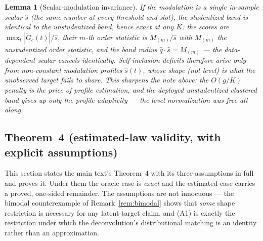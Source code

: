 \documentclass[12pt]{article}
\newtheorem{lemma}{Lemma}
\theoremstyle{definition}
\theoremstyle{remark}
\newcommand{\Gtilde}{\widetilde{G}}
\begin{document}
\begin{lemma}[Scalar-modulation invariance]\label{lem:scalar}
If the modulation is a single in-sample \emph{scalar} $\widehat s$ (the same number at
every threshold and slot), the studentized band is \emph{identical} to the
unstudentized band, hence exact at any $K$: the scores are
$\max_t|\Gtilde_c(t)|/\widehat s$, their $m$-th order statistic is $M_{(m)}/\widehat s$ with
$M_{(m)}$ the unstudentized order statistic, and the band radius
$\widehat q\cdot\widehat s=M_{(m)}$ --- the data-dependent scalar cancels
identically. Self-inclusion deficits therefore arise \emph{only} from non-constant
modulation profiles $\widehat s(t)$, whose \emph{shape} (not level) is what the
unobserved target fails to share. This sharpens the note above: the $O(g/K)$ penalty
is the price of profile estimation, and the deployed unstudentized
clustered band gives up only
the profile adaptivity --- the level normalization was free all along.
\end{lemma}

\subsection{Theorem~4 (estimated-law validity, with explicit assumptions)}

This section states the main text's Theorem~4 with its three assumptions in
full and proves it. Under them the oracle case is \emph{exact} and the
estimated case carries a proved, one-sided remainder. The assumptions are
not innocuous --- the bimodal counterexample
of Remark~\ref{rem:bimodal} shows that \emph{some} shape restriction is necessary for
any latent-target claim, and (A1) is exactly the restriction under which the
deconvolution's distributional matching is an identity rather than an approximation.
\end{document}
